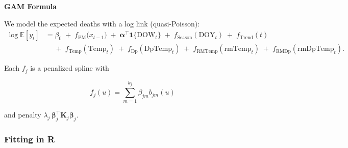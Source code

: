 \documentclass[
  letterpaper,
  DIV=11,
  numbers=noendperiod]{scrreprt}
\begin{document}
\textbf{GAM Formula}

We model the expected deaths with a log link (quasi-Poisson): \[
\begin{aligned}
\log \mathbb{E}[y_t]
&= \beta_0
\;+\; f_{\text{PM}}\!\big(x_{t-1}\big)
\;+\; \boldsymbol{\alpha}^{\top}\mathbf{1}\{\text{DOW}_t\}
\;+\; f_{\text{Season}}(\text{DOY}_t)
\;+\; f_{\text{Trend}}(t) \\
&\quad
\;+\; f_{\text{Temp}}(\text{Temp}_t)
\;+\; f_{\text{Dp}}(\text{DpTemp}_t)
\;+\; f_{\text{RMTemp}}(\text{rmTemp}_t)
\;+\; f_{\text{RMDp}}(\text{rmDpTemp}_t).
\end{aligned}
\]

Each \(f_j\) is a penalized spline with

\[
f_j(u) = \sum_{m=1}^{k_j} \beta_{jm} b_{jm}(u)
\]

and penalty
\(\lambda_j\,\boldsymbol{\beta}_j^\top \mathbf{K}_j \boldsymbol{\beta}_j.\)

\hypertarget{fitting-in-r}{%
\subsubsection*{Fitting in R}\label{fitting-in-r}}
\end{document}
